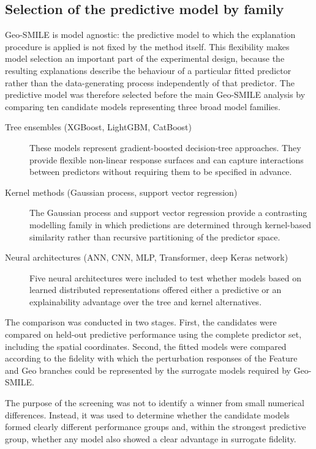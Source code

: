 \subsection{Selection of the predictive model by family}
\label{sec}

Geo-SMILE is model agnostic: the predictive model to which the explanation procedure is applied is not fixed by the method itself. This flexibility makes model selection an important part of the experimental design, because the resulting explanations describe the behaviour of a particular fitted predictor rather than the data-generating process independently of that predictor. The predictive model was therefore selected before the main Geo-SMILE analysis by comparing ten candidate models representing three broad model families.

\begin{description}

\item[Tree ensembles (XGBoost, LightGBM, CatBoost)]
These models represent gradient-boosted decision-tree approaches. They provide flexible non-linear response surfaces and can capture interactions between predictors without requiring them to be specified in advance.

\item[Kernel methods (Gaussian process, support vector regression)]
The Gaussian process and support vector regression provide a contrasting modelling family in which predictions are determined through kernel-based similarity rather than recursive partitioning of the predictor space.

\item[Neural architectures (ANN, CNN, MLP, Transformer, deep Keras network)]
Five neural architectures were included to test whether models based on learned distributed representations offered either a predictive or an explainability advantage over the tree and kernel alternatives.

\end{description}

The comparison was conducted in two stages. First, the candidates were compared on held-out predictive performance using the complete predictor set, including the spatial coordinates. Second, the fitted models were compared according to the fidelity with which the perturbation responses of the Feature and Geo branches could be represented by the surrogate models required by Geo-SMILE.

The purpose of the screening was not to identify a winner from small numerical differences. Instead, it was used to determine whether the candidate models formed clearly different performance groups and, within the strongest predictive group, whether any model also showed a clear advantage in surrogate fidelity.

